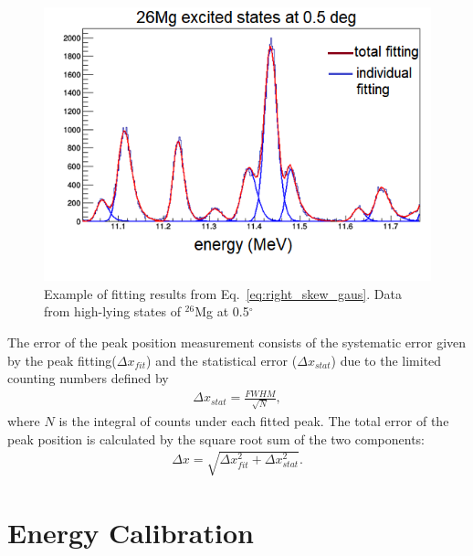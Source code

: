 \begin{figure}[tpb]
  \begin{center}
    \centerline{\includegraphics[scale=0.8]{graph/ch5/fitting}}
    \caption{Example of fitting results from Eq.~\ref{eq:right_skew_gaus}. Data from high-lying states of $^{26}$Mg at 0.5$^{\circ}$}
    \label{fig:fitting}
  \end{center}
\end{figure}

The error of the peak position measurement consists of the systematic error given by  the peak fitting($\Delta x_{fit}$) and the statistical error ($\Delta x_{stat}$) due to the limited counting numbers defined by
\begin{equation}
    \label{eq:x_stat}
    \begin{aligned}
       \Delta x_{stat} = \frac{FWHM}{\sqrt{N}},
    \end{aligned}
\end{equation}
where $N$ is the integral of counts under each fitted peak. The total error of the peak position is calculated by the square root sum of the two components:
\begin{equation}
    \label{eq:x_error}
    \begin{aligned}
       \Delta x = \sqrt{\Delta x^2_{fit} + \Delta x^2_{stat}}.
    \end{aligned}
\end{equation}

\section{Energy Calibration}

